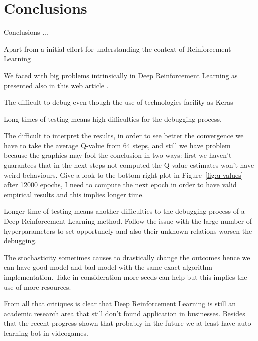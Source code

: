 \section{Conclusions}

Conclusions ...


Apart from a initial effort for understanding the context of Reinforcement Learning 

We faced with big problems intrinsically in Deep Reinforcement Learning as presented also in this web article \cite{rlblogpost}. 

The difficult to debug even though the use of technologies facility as Keras

Long times of testing means high difficulties for the debugging process.

The difficult to interpret the results, in order to see better the convergence we have to take the average Q-value from 64 steps, and still we have problem because the graphics may fool the conclusion in two ways: first we haven't guarantees that in the next steps not computed the Q-value estimates won't have weird behaviours. Give a look to the bottom right plot in Figure~\ref{fig:q-values} after 12000 epochs, I need to compute the next epoch in order to have valid empirical results and this implies longer time. 

Longer time of testing means another difficulties to the debugging process of a Deep Reinforcement Learning method. Follow the issue with the large number of hyperparameters to set opportunely and also their unknown relations worsen the debugging.

The stochasticity sometimes causes to drastically change the outcomes hence we can have good model and bad model with the same exact algorithm implementation. Take in consideration more seeds can help but this implies the use of more resources. 

From all that critiques is clear that Deep Reinforcement Learning is still an academic research area that still don't found application in businesses. Besides that the recent progress shown that probably in the future we at least have auto-learning bot in videogames.